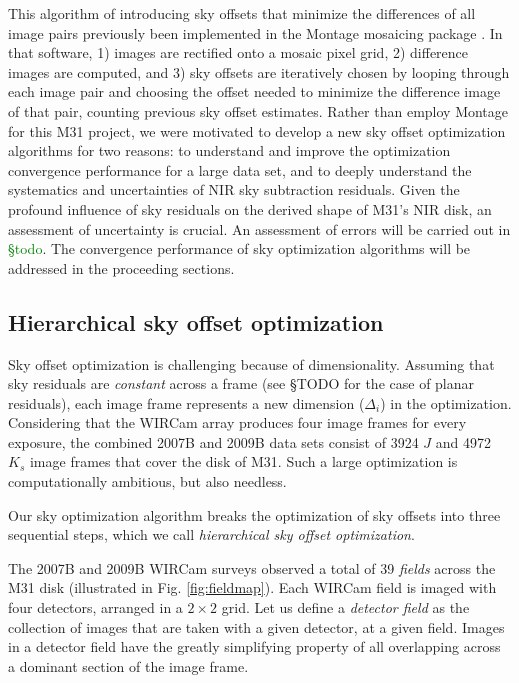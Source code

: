 \documentclass[iop]{emulateapj}
\newcommand{\todo}[1]{\textcolor{green}{#1}} %
\begin{document}
This algorithm of introducing sky offsets that minimize the differences of all image pairs previously been implemented in the Montage mosaicing package \citep{Berriman:2008}. In that software, 1) images are rectified onto a mosaic pixel grid, 2) difference images are computed, and 3) sky offsets are iteratively chosen by looping through each image pair and choosing the offset needed to minimize the difference image of that pair, counting previous sky offset estimates. Rather than employ Montage for this M31 project, we were motivated to develop a new sky offset optimization algorithms for two reasons: to understand and improve the optimization convergence performance for a large data set, and to deeply understand the systematics and uncertainties of NIR sky subtraction residuals. Given the profound influence of sky residuals on the derived shape of M31's NIR disk, an assessment of uncertainty is crucial. An assessment of errors will be carried out in \todo{\S todo}. The convergence performance of sky optimization algorithms will be addressed in the proceeding sections.

\subsection{Hierarchical sky offset optimization}

Sky offset optimization is challenging because of dimensionality. Assuming that sky residuals are \emph{constant} across a frame (see \S TODO for the case of planar residuals), each image frame represents a new dimension ($\Delta_i$) in the optimization. Considering that the WIRCam array produces four image frames for every exposure, the combined 2007B and 2009B data sets consist of 3924 $J$ and 4972 $K_s$ image frames that cover the disk of M31. Such a large optimization is computationally ambitious, but also needless.

Our sky optimization algorithm breaks the optimization of sky offsets into three sequential steps, which we call \emph{hierarchical sky offset optimization}.

The 2007B and 2009B WIRCam surveys observed a total of 39 \emph{fields} across the M31 disk (illustrated in Fig. \ref{fig:fieldmap}). Each WIRCam field is imaged with four detectors, arranged in a $2\times 2$ grid. Let us define a \emph{detector field} as the collection of images that are taken with a given detector, at a given field. Images in a detector field have the greatly simplifying property of all overlapping across a dominant section of the image frame.
\end{document}
